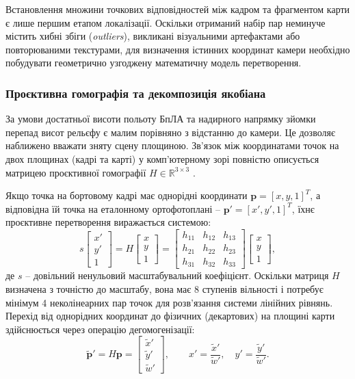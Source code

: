 \documentclass[a4paper, 12pt, titlepage]{article}
\begin{document}
Встановлення множини точкових відповідностей між кадром та фрагментом карти є лише першим етапом локалізації. Оскільки отриманий набір пар неминуче містить хибні збіги (\textit{outliers}), викликані візуальними артефактами або повторюваними текстурами, для визначення істинних координат камери необхідно побудувати геометрично узгоджену математичну модель перетворення.

\subsubsection{Проєктивна гомографія та декомпозиція якобіана}
За умови достатньої висоти польоту БпЛА та надирного напрямку зйомки перепад висот рельєфу є малим порівняно з відстанню до камери. Це дозволяє наближено вважати зняту сцену площиною. Зв'язок між координатами точок на двох площинах (кадрі та карті) у комп'ютерному зорі повністю описується матрицею проєктивної гомографії $H \in \mathbb{R}^{3 \times 3}$ \cite{hartley}.

Якщо точка на бортовому кадрі має однорідні координати $\mathbf{p} = [x, y, 1]^T$, а відповідна їй точка на еталонному ортофотоплані -- $\mathbf{p}' = [x', y', 1]^T$, їхнє проєктивне перетворення виражається системою:
\begin{equation}
s \begin{bmatrix} x' \\ y' \\ 1 \end{bmatrix} = H \begin{bmatrix} x \\ y \\ 1 \end{bmatrix} = \begin{bmatrix} h_{11} & h_{12} & h_{13} \\ h_{21} & h_{22} & h_{23} \\ h_{31} & h_{32} & h_{33} \end{bmatrix} \begin{bmatrix} x \\ y \\ 1 \end{bmatrix},
\label{eq:homography_matrix}
\end{equation}
де $s$ -- довільний ненульовий масштабувальний коефіцієнт. Оскільки матриця $H$ визначена з точністю до масштабу, вона має 8 ступенів вільності і потребує мінімум 4 неколінеарних пар точок для розв'язання системи лінійних рівнянь. Перехід від однорідних координат до фізичних (декартових) на площині карти здійснюється через операцію дегомогенізації:
\begin{equation}
\tilde{\mathbf{p}}' = H \mathbf{p} = \begin{bmatrix} \tilde{x}' \\ \tilde{y}' \\ \tilde{w}' \end{bmatrix}, \qquad x' = \frac{\tilde{x}'}{\tilde{w}'}, \quad y' = \frac{\tilde{y}'}{\tilde{w}'}.
\end{equation}
\end{document}
